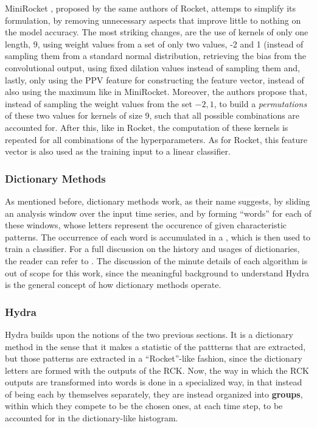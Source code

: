 MiniRocket \cite{Dempster2021MR}, proposed by the same authors of Rocket, attemps to simplify its formulation, by removing unnecessary aspects that improve little to nothing on the model accuracy. 
The most striking changes, are the use of kernels of only one length, 9, using weight values from a set of only two values, -2 and 1 (instead of sampling them from a standard normal distribution, retrieving the bias from the convolutional output, using fixed dilation values instead of sampling them and, lastly, only using the PPV feature for constructing the feature vector, instead of also using the maximum like in MiniRocket.
Moreover, the authors propose that, instead of sampling the weight values from the set ${-2, 1}$, to build a \emph{permutations} of these two values for kernels of size 9, such that all possible combinations are accounted for. 
After this, like in Rocket, the computation of these kernels is repeated for all combinations of the hyperparameters. As for Rocket, this feature vector is also used as the training input to a linear classifier.

\subsubsection{Dictionary Methods}
As mentioned before, dictionary methods work, as their name suggests, by sliding an analysis window over the input time series, and by forming ``words'' for each of these windows, whose letters represent the occurence of given characteristic patterns.
The occurrence of each word is accumulated in a , which is then used to train a classifier. 
For a full discussion on the history and usages of dictionaries, the reader can refer to \cite{Dempster2020}. 
The discussion of the minute details of each algorithm is out of scope for this work, since the meaningful background to understand Hydra is the general concept of how dictionary methods operate.

\subsubsection{Hydra}
Hydra builds upon the notions of the two previous sections. It is a dictionary method in the sense that it makes a statistic of the pattterns that are extracted, but those patterns are extracted in a ``Rocket''-like fashion, since the dictionary letters are formed with the outputs of the RCK.
Now, the way in which the RCK outputs are transformed into words is done in a specialized way, in that instead of being each by themselves separately, they are instead organized into \textbf{groups}, within which they compete to be the chosen ones, at each time step, to be accounted for in the dictionary-like histogram.

